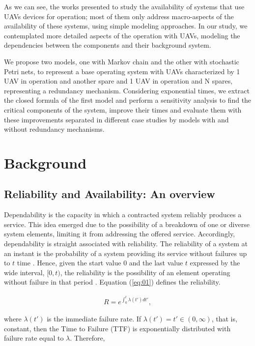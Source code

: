 \documentclass[conference]{IEEEtran}
\begin{document}
As we can see, the works presented to study the availability of systems that use UAVs devices for operation; most of them only address macro-aspects of the availability of these systems, using simple modeling approaches. In our study, we contemplated more detailed aspects of the operation with UAVs, modeling the dependencies between the components and their background system. 

We propose two models, one with Markov chain and the other with stochastic Petri nets, to represent a base operating system with UAVs characterized by 1 UAV in operation and another spare and 1 UAV in operation and N spares, representing a redundancy mechanism. Considering exponential times, we extract the closed formula of the first model and perform a sensitivity analysis to find the critical components of the system, improve their times and evaluate them with these improvements separated in different case studies by models with and without redundancy mechanisms.

\section{Background}\label{sec:background}

\subsection{Reliability and Availability: An overview}
Dependability is the capacity in which a contracted system reliably produces a service. This idea emerged due to the possibility of a breakdown of one or diverse system elements, limiting it from addressing the offered service. Accordingly, dependability is straight associated with reliability. The reliability of a system at an instant is the probability of a system providing its service without failures up to $t$ time \citep{avizienis2004basic}. Hence, given the start value $0$ and the last value $t$ expressed by the wide interval, $[0,t)$, the reliability is the possibility of an element operating without failure in that period \citep{trivedi2008probability}. Equation (\ref{eq:01}) defines the reliability.

\begin{align}\label{eq:01}
R = e^{\int_{0}^{t} \lambda(t')dt'},
\end{align}

where $\lambda (t')$ is the immediate failure rate. If $\lambda (t') = t'\in (0,\infty)$, that is, constant, then the Time to Failure (TTF) is exponentially distributed with failure rate equal to $\lambda$. Therefore,
\end{document}
